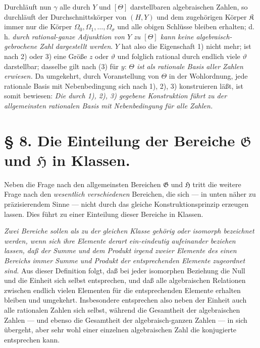 Durchläuft nun $\gamma$ alle durch $Y$ und $[\Theta]$ darstellbaren
algebraischen Zahlen, so durchläuft der Durchschnittskörper von $(H,Y)$ und dem
zugehörigen Körper $\mathfrak K$ immer nur die Körper
$\Omega_0,\Omega_1,\ldots,\Omega_\sigma$ und alle obigen Schlüsse bleiben
erhalten; d. h. \emph{durch rational-ganze Adjunktion von $Y$ zu $[\Theta]$ kann
keine algebraisch-gebrochene Zahl dargestellt werden}. $Y$ hat also die
Eigenschaft 1) nicht mehr; ist nach 2) oder 3) eine Größe $z$ oder $\vartheta$
und folglich rational durch endlich viele $\vartheta$ darstellbar; dasselbe gilt
nach (3) für $y$: \emph{$\Theta$ ist als rationale Basis aller Zahlen erwiesen.}
Da umgekehrt, durch Voranstellung von $\Theta$ in der Wohlordnung, jede
rationale Basis mit Nebenbedingung sich nach 1), 2), 3) konstruieren läßt, ist
somit bewiesen: \emph{Die durch 1), 2), 3) gegebene Konstruktion führt zu der
allgemeinsten rationalen Basis mit Nebenbedingung für alle Zahlen.}

\section*{§ 8. Die Einteilung der Bereiche $\mathfrak G$ und $\mathfrak H$ in Klassen.}

Neben die Frage nach den allgemeinsten Bereichen $\mathfrak G$ und $\mathfrak H$
tritt die weitere Frage nach den \emph{wesentlich verschiedenen} Bereichen, die
sich --- in unten näher zu präzisierendem Sinne --- nicht durch das gleiche
Konstruktionsprinzip erzeugen lassen. Dies führt zu einer Einteilung dieser
Bereiche in Klassen.

\emph{Zwei Bereiche sollen als zu der gleichen Klasse gehörig oder isomorph
bezeichnet werden, wenn sich ihre Elemente derart ein-eindeutig aufeinander
beziehen lassen, daß der Summe und dem Produkt irgend zweier Elemente des einen
Bereichs immer Summe und Produkt der entsprechenden Elemente zugeordnet sind.}
Aus dieser Definition folgt, daß bei jeder isomorphen Beziehung die Null und die
Einheit sich selbst entsprechen, und daß alle algebraischen Relationen zwischen
endlich vielen Elementen für die entsprechenden Elemente erhalten bleiben und
umgekehrt. Insbesondere entsprechen also neben der Einheit auch alle rationalen
Zahlen sich selbst, während die Gesamtheit der algebraischen Zahlen --- und
ebenso die Gesamtheit der algebraisch-ganzen Zahlen --- in sich übergeht, aber
sehr wohl einer einzelnen algebraischen Zahl die konjugierte entsprechen kann.

